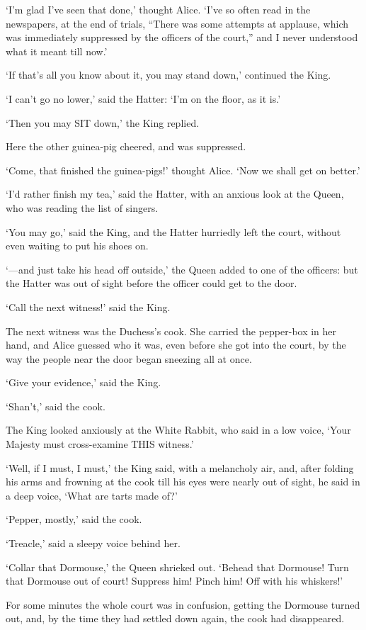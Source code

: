 \documentclass[12pt]{article}
\begin{document}
\begin{Parallel}[p]{}{}
{‘I’m glad I’ve seen that done,’ thought Alice. ‘I’ve so often read in the newspapers, at the end of trials, “There was some attempts at applause, which was immediately suppressed by the officers of the court,” and I never understood what it meant till now.’

‘If that’s all you know about it, you may stand down,’ continued the King.

‘I can’t go no lower,’ said the Hatter: ‘I’m on the floor, as it is.’

‘Then you may SIT down,’ the King replied.

Here the other guinea-pig cheered, and was suppressed.

‘Come, that finished the guinea-pigs!’ thought Alice. ‘Now we shall get on better.’

‘I’d rather finish my tea,’ said the Hatter, with an anxious look at the Queen, who was reading the list of singers.

‘You may go,’ said the King, and the Hatter hurriedly left the court, without even waiting to put his shoes on.

‘—and just take his head off outside,’ the Queen added to one of the officers: but the Hatter was out of sight before the officer could get to the door.

‘Call the next witness!’ said the King.

The next witness was the Duchess’s cook. She carried the pepper-box in her hand, and Alice guessed who it was, even before she got into the court, by the way the people near the door began sneezing all at once.

‘Give your evidence,’ said the King.

‘Shan’t,’ said the cook.

The King looked anxiously at the White Rabbit, who said in a low voice, ‘Your Majesty must cross-examine THIS witness.’

‘Well, if I must, I must,’ the King said, with a melancholy air, and, after folding his arms and frowning at the cook till his eyes were nearly out of sight, he said in a deep voice, ‘What are tarts made of?’

‘Pepper, mostly,’ said the cook.

‘Treacle,’ said a sleepy voice behind her.

‘Collar that Dormouse,’ the Queen shrieked out. ‘Behead that Dormouse! Turn that Dormouse out of court! Suppress him! Pinch him! Off with his whiskers!’

For some minutes the whole court was in confusion, getting the Dormouse turned out, and, by the time they had settled down again, the cook had disappeared.

}
\end{Parallel}
\end{document}
